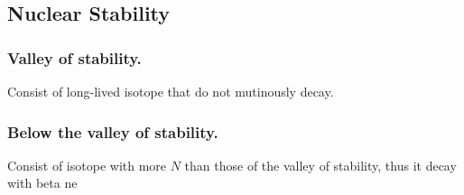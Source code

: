 \documentclass[../../../main.tex]{subfiles}
\begin{document}
\subsection*{Nuclear Stability}
\subsubsection*{Valley of stability.}  Consist of long-lived isotope that do not mutinously decay.

\subsubsection*{Below the valley of stability.} Consist of isotope with more $N$ than those of the valley of stability, thus it decay with beta ne
\begin{figure*}
    \centering
\end{figure*}
\end{document}
